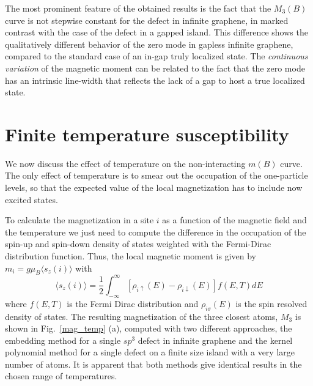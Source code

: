 The most prominent feature of the obtained results is the fact that the
$M_3(B)$ curve is not stepwise constant for the defect in infinite graphene, in marked contrast with the case of the defect in a gapped island.
This difference shows the qualitatively different behavior of the zero mode in gapless infinite graphene, compared to the standard case of an in-gap truly localized state. The \emph{continuous variation} of the magnetic moment can be related to the fact that the zero mode has an intrinsic line-width that reflects the lack of a gap to host a true localized state.




\section{Finite temperature susceptibility}
\label{sec:Temp}
We now discuss the effect of temperature on the non-interacting $m(B)$ curve. The only effect of temperature is to smear out the occupation of the one-particle levels, so that the expected value of the local magnetization has to include now excited states.

To calculate the magnetization in a site $i$  as a function of the magnetic field and the temperature we just need to compute the difference in the occupation of the spin-up and spin-down density of states weighted with the Fermi-Dirac distribution function. Thus, the local magnetic moment is given by $m_i = g\mu_B \langle s_z(i) \rangle$ with
\begin{equation}
       \langle s_z(i) \rangle = \frac{1}{2}
      \int^{\infty}_{-\infty}\left[
      \rho_{i\uparrow}(E)-\rho_{i \downarrow}(E)
      \right] f(E,T) dE
\label{mag_b_t}
\end{equation}
where $f(E,T)$ is the Fermi Dirac distribution and $\rho_{i\sigma}(E)$ is the
spin resolved density of states. The resulting magnetization of the three
closest atoms, $M_3$ is shown in Fig.~\ref{mag_temp} (a), computed with two
different approaches, the embedding method for a single $sp^3$ defect in
infinite graphene and the kernel polynomial method for a single defect on a
finite size island with a very large number of atoms.
It is apparent that both methods give identical results in the chosen range of temperatures.

